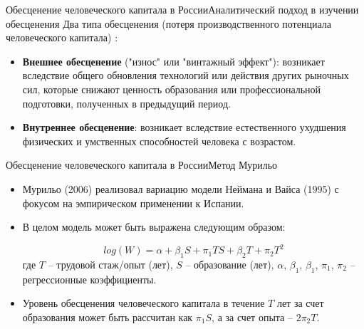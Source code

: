 \documentclass{beamer}
\begin{document}
\begin{frame}{Обесценение человеческого капитала в России}{Аналитический подход в изучении обесценения}
	Два типа обесценения (потеря производственного потенциала человеческого капитала) \citep{neuman_091._1995}:
	\begin{itemize}
		\item \textbf{Внешнее обесценение} ("износ" или "винтажный эффект"): возникает вследствие общего обновления технологий или действия других рыночных сил, которые снижают ценность образования или профессиональной подготовки, полученных в предыдущий период.
		\item \textbf{Внутреннее обесценение}: возникает вследствие естественного ухудшения физических и умственных способностей человека с возрастом.
	\end{itemize}
\end{frame}

\begin{frame}{Обесценение человеческого капитала в России}{Метод Мурильо}
\begin{itemize}
	\item Мурильо (2006) реализовал вариацию модели Неймана и Вайса (1995) с фокусом на эмпирическом применении к Испании.
	\item В целом модель может быть выражена следующим образом:
	
	\begin{equation}
	log(W) = \alpha +  \beta_{1}S + \pi_{1}TS + \beta_{2}T + \pi_{2}T^{2} 
	\end{equation}
	где $T$ -- трудовой стаж/опыт (лет), $S$ -- образование (лет), $\alpha$, $\beta_{1}$, $\beta_{1}$, $\pi_{1}$, $\pi_{2}$ -- регрессионные коэффициенты.
	\vspace{2pt}
	\item Уровень обесценения человеческого капитала в течение $T$ лет за счет образования может быть рассчитан как $\pi_{1}S $, а за счет опыта -- $ 2\pi_{2}T$.
\end{itemize}
\end{frame}

\end{document}
